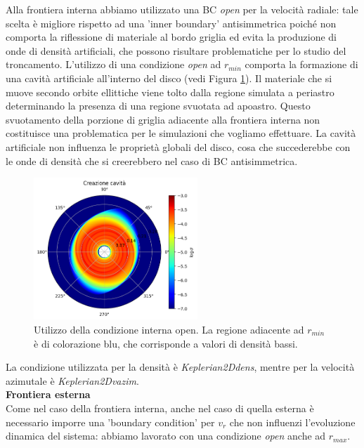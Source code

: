 Alla frontiera interna abbiamo utilizzato una BC \textit{open} per la velocità radiale: tale scelta è migliore rispetto ad una 'inner boundary' antisimmetrica poiché non comporta la riflessione di materiale al bordo griglia ed evita la produzione di onde di densità artificiali, che possono risultare problematiche per lo studio del troncamento.
L'utilizzo di una condizione \textit{open} ad $r_{min}$ comporta la formazione di una cavità artificiale all'interno del disco (vedi Figura \ref{fig:cav_int}).
Il materiale che si muove secondo orbite ellittiche viene tolto dalla regione simulata a periastro determinando la presenza di una regione svuotata ad apoastro.
Questo svuotamento della porzione di griglia adiacente alla frontiera interna non costituisce una problematica per le simulazioni che vogliamo effettuare. La cavità artificiale non influenza le proprietà globali del disco, cosa che succederebbe con le onde di densità che si creerebbero nel caso di BC antisimmetrica.
\begin{figure}[h]
    \centering
    \includegraphics[width=0.55\textwidth]{Immagini/Simulazioni/FormazioneCavita.png}
    \caption{Utilizzo della condizione interna open. La regione adiacente ad $r_{min}$ è di colorazione blu, che corrisponde a valori di densità bassi.}
    \label{fig:cav_int}
\end{figure}
La condizione utilizzata per la densità è \textit{Keplerian2Ddens}, mentre per la velocità azimutale è \textit{Keplerian2Dvazim}.\\

\textbf{Frontiera esterna} \\

Come nel caso della frontiera interna, anche nel caso di quella esterna è necessario imporre una 'boundary condition' per $v_r$ che non influenzi l'evoluzione dinamica del sistema: abbiamo lavorato con una condizione \textit{open} anche ad $r_{max}$.

